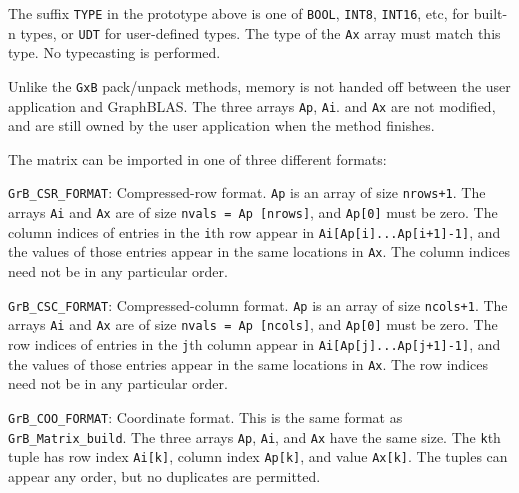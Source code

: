 \documentclass[12pt]{article}
\newenvironment{packed_itemize}{
\begin{itemize}
  \setlength{\itemsep}{1pt}
  \setlength{\parskip}{0pt}
  \setlength{\parsep}{0pt}
}{\end{itemize}}
\begin{document}
The suffix \verb'TYPE' in the prototype above is one of \verb'BOOL',
\verb'INT8', \verb'INT16', etc, for built-n types, or \verb'UDT' for
user-defined types.  The type of the \verb'Ax' array must match this type.  No
typecasting is performed.

Unlike the \verb'GxB'
pack/unpack methods, memory is not handed off between the user application
and GraphBLAS.   The three arrays \verb'Ap', \verb'Ai'.  and \verb'Ax' are not
modified, and are still owned by the user application when the method finishes.

The matrix can be imported in one of three different formats:

\begin{packed_itemize}
    \item \verb'GrB_CSR_FORMAT': %
        Compressed-row format.  \verb'Ap' is an array of size \verb'nrows+1'.
        The arrays \verb'Ai' and \verb'Ax' are of size \verb'nvals = Ap [nrows]',
        and \verb'Ap[0]' must be zero.
        The column indices of entries in the \verb'i'th row appear in
        \verb'Ai[Ap[i]...Ap[i+1]-1]', and the values of those entries appear in
        the same locations in \verb'Ax'.
        The column indices need not be in any particular order.

    \item \verb'GrB_CSC_FORMAT': %
        Compressed-column format.  \verb'Ap' is an array of size \verb'ncols+1'.
        The arrays \verb'Ai' and \verb'Ax' are of size \verb'nvals = Ap [ncols]',
        and \verb'Ap[0]' must be zero.
        The row indices of entries in the \verb'j'th column appear in
        \verb'Ai[Ap[j]...Ap[j+1]-1]', and the values of those entries appear in
        the same locations in \verb'Ax'.
        The row indices need not be in any particular order.
        
    \item \verb'GrB_COO_FORMAT': %
        Coordinate format.  This is the same format as \newline
        \verb'GrB_Matrix_build'.
        The three arrays \verb'Ap', \verb'Ai', and \verb'Ax' have the same
        size.  The \verb'k'th tuple has row index \verb'Ai[k]',
        column index \verb'Ap[k]', and value \verb'Ax[k]'.  The tuples can
        appear any order, but no duplicates are permitted.

%

\end{packed_itemize}
\end{document}
